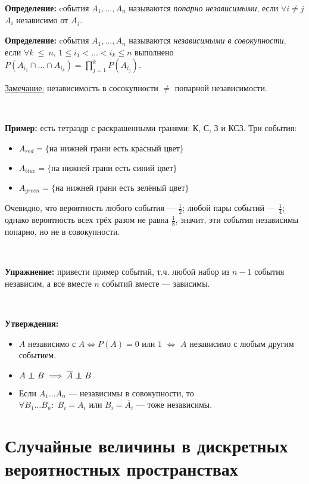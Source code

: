 \textbf{Определение:} cобытия $A_1, \ldots, A_n$ называются \emph{попарно независимыми}, если $\forall i \neq j$ $A_i$ независимо от $A_j$.

\textbf{Определение:} cобытия $A_1, \ldots, A_n$ называются \emph{независимыми в совокупности}, если $\forall k ~\leqslant~ n$, $1\leqslant i_1<\ldots< i_k \leqslant n$ выполнено  
$P(A_{i_1}\cap\ldots\cap A_{i_k}) = \prod\limits_{j=1}^{k} P(A_{i_j})$.

\underline{Замечание:} независимость в сосокупности $\neq$ попарной независимости.

~\

\textbf{Пример:} есть тетраэдр с раскрашенными гранями: К, С, З и КСЗ. Три события:
\begin{itemize}
    \item  $A_{red} = \{\text{на нижней грани есть красный цвет}\}$
    \item  $A_{blue} = \{\text{на нижней грани есть синий цвет}\}$
    \item  $A_{green} = \{\text{на нижней грани есть зелёный цвет}\}$
\end{itemize}

Очевидно, что вероятность любого события --- $\frac{1}{2}$; любой пары событий --- $\frac{1}{4}$; однако вероятность всех трёх разом не равна $\frac{1}{8}$, значит, эти события независимы попарно, но не в совокупности.

~\

\textbf{Упражнение:} привести пример событий, т.ч. любой набор из $n-1$ события независим, а все вместе $n$ событий вместе --- зависимы.

~\

\textbf{Утверждения:}
\begin{itemize}
    \item $A$ независимо с $A \Leftrightarrow P(A) = 0$ или $1$ $\Leftrightarrow$ $A$ независимо с любым другим событием.
    \item $A \independent B \implies \overline{A}\independent B$
    \item Если $A_1 \ldots A_n$ --- независимы в совокупности, то $\forall B_1 \dots B_n : \; B_i = A_i \text{ или } B_i = \overline{A_i}$ --- тоже независимы.
\end{itemize}

\section{Случайные величины в дискретных вероятностных пространствах}

